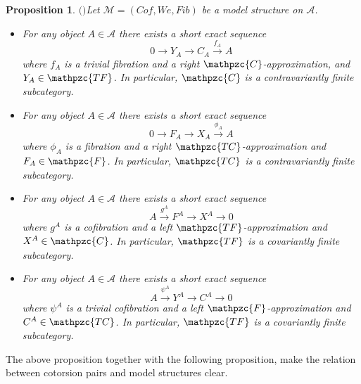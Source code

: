 \documentclass[12pt]{amsart}
\numberwithin{equation}{section}
\newtheorem{proposition}[lemma]{Proposition}
\theoremstyle{definition}
\newtheorem*{theorem 0*}{Theorem}
\newtheorem*{theorem a*}{Theorem A}
\newtheorem*{theorem b*}{Theorem B}
\numberwithin{diagram}{section}
\begin{document}
	\begin{proposition}$($\cite[VII, Proposition 2.1]{BR}$)$\label{2.10}
	Let $\mathcal{M}=(Cof,We,Fib)$ be a model structure on $\mathcal{A}$.
	\begin{itemize}
	\item[(1)]
	For any object $A\in \mathcal{A}$ there exists a short exact sequence
	\begin{equation*}
	0\rightarrow Y_A\rightarrow C_A\overset{f_A}{\longrightarrow}A
	\end{equation*}
	where $f_A$ is a trivial fibration and a right $\mathpzc{C}$-approximation, and $Y_A\in\mathpzc{TF}$.
	In particular, $\mathpzc{C}$ is a contravariantly finite subcategory.
	\item[(2)]
	For any object $A\in \mathcal{A}$ there exists a short exact sequence
	\begin{equation*}
	0\rightarrow F_A\rightarrow X_A\overset{\phi_A}{\longrightarrow}A
	\end{equation*}
	where $\phi_A$ is a fibration and a right $\mathpzc{TC}$-approximation and $F_A\in\mathpzc{F}$.
	In particular, $\mathpzc{TC}$ is a contravariantly finite subcategory.
	\item[(3)]
	For any object $A\in \mathcal{A}$ there exists a short exact sequence
	\begin{equation*}
	A\overset{g^A}{\longrightarrow} F^A\rightarrow X^A\rightarrow 0
	\end{equation*}
	where $g^A$ is a cofibration and a left $\mathpzc{TF}$-approximation and $X^A\in\mathpzc{C}$.
	In particular, $\mathpzc{TF}$ is a covariantly finite subcategory.
	\item[(4)]
	For any object $A\in \mathcal{A}$ there exists a short exact sequence
	\begin{equation*}
	A\overset{\psi^A}{\longrightarrow} Y^A\rightarrow C^A\rightarrow 0
	\end{equation*}
	where $\psi^A$ is a trivial cofibration and a left $\mathpzc{F}$-approximation and $C^A\in\mathpzc{TC}$.
	In particular, $\mathpzc{TF}$ is a covariantly finite subcategory.
	\end{itemize}
	\end{proposition}
	
	The above proposition together with the following proposition, make the relation between cotorsion pairs and model structures clear.
	
\end{document}
